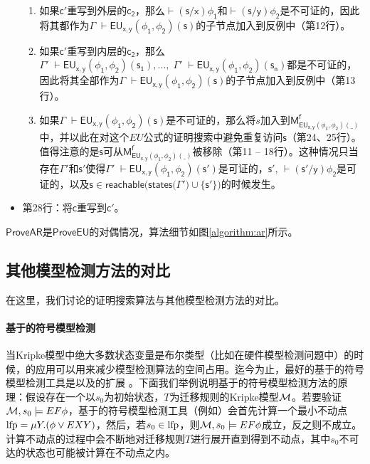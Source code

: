 \begin{itemize}
\begin{enumerate}
		\item 如果$\mathsf{c'}$重写到外层的$\mathsf{c_2}$，那么$\mathsf{\vdash (s/x)\phi_1}$和$\mathsf{\vdash (s/y)\phi_2}$是不可证的，因此将其都作为$\Gamma\;\mathsf{\vdash EU_{x,y}(\phi_1,\phi_2)(s)}$的子节点加入到反例中（第12行）。
		\item 如果$\mathsf{c'}$重写到内层的$\mathsf{c_2}$，那么$\Gamma'\;\mathsf{\vdash EU_{x,y}(\phi_1,\phi_2)(s_1)},...,\;\Gamma'\;\mathsf{\vdash EU_{x,y}(\phi_1,\phi_2)(s_n)}$都是不可证的，因此将其全部作为$\Gamma\;\mathsf{\vdash EU_{x,y}(\phi_1,\phi_2)(s)}$的子节点加入到反例中（第13行）。
		\item 如果$\Gamma\;\mathsf{\vdash EU_{x,y}(\phi_1,\phi_2)(s)}$是不可证的，那么将$s$加入到$\mathsf{M_{EU_{x,y}(\phi_1,\phi_2)(\_)}^f}$中，并以此在对这个$EU$公式的证明搜索中避免重复访问$\mathsf{s}$（第24、25行）。值得注意的是$\mathsf{s}$可从$\mathsf{M_{EU_{x,y}(\phi_1,\phi_2)(\_)}^f}$被移除（第11 -- 18行）。这种情况只当存在${\Gamma'}$和$\mathsf{s'}$使得$\Gamma'\;\mathsf{\vdash EU_{x,y}(\phi_1,\phi_2)(s')}$是可证的，$\mathsf{s'}$, $\mathsf{\vdash (s'/y)\phi_2}$是可证的，以及$\mathsf{s\in reachable(states(}\Gamma'\mathsf{)\cup \{s'\})}$的时候发生。
	\end{enumerate}
	\item 第28行：将$\mathsf{c}$重写到$\mathsf{c'}$。
\end{itemize}

$\mathsf{ProveAR}$是$\mathsf{ProveEU}$的对偶情况，算法细节如图\ref{algorithm:ar}所示。


\subsection{其他\CTL{}模型检测方法的对比}
在这里，我们讨论\sctlprov{}的证明搜索算法与其他\CTLP{}模型检测方法的对比。

\paragraph{基于\BDD{}的符号模型检测}
当Kripke模型中绝大多数状态变量是布尔类型（比如在硬件模型检测问题中）的时候，\BDD{}的应用可以用来减少模型检测算法的空间占用。迄今为止，最好的基于\BDD{}的符号模型检测工具是\nusmv{}\cite{mcmillan93,CimattiCGR99}以及\nusmv{}的扩展\nuxmv{} \cite{CAVCDGMMMRT14}。下面我们举例说明基于\BDD{}的符号模型检测方法的原理：假设存在一个以$s_0$为初始状态，$T$为迁移规则的Kripke模型$\cal M$。若要验证${\cal M},s_0\models EF\phi$，基于\BDD{}的符号模型检测工具（例如\nusmv{}）会首先计算一个最小不动点$\textup{lfp}=\mu Y. (\phi\vee EXY)$，然后，若$s_0\in \textup{lfp}$，则${\cal M},s_0\models EF\phi$成立，反之则不成立。计算不动点的过程中会不断地对迁移规则$T$进行展开直到得到不动点，其中$s_0$不可达的状态也可能被计算在不动点之内。

